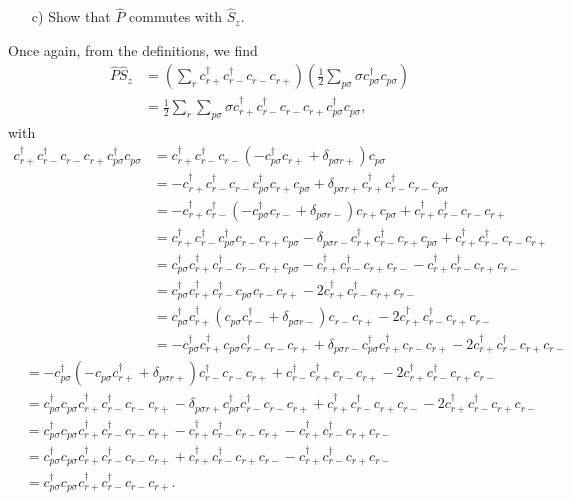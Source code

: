 \documentclass[a4paper]{article}
\newcommand{\nn}{\nonumber}
\newcommand{\ps}{{p\sigma}}
\newcommand{\crp}{c_{r+}}
\newcommand{\crpd}{c_{r+}^\dagger}
\newcommand{\crm}{c_{r-}}
\newcommand{\crmd}{c_{r-}^\dagger}
\begin{document}
\begin{exframe}
\begin{itemize}
  \item[c)] Show that $\hat P$ commutes with $\hat S_z$.
\end{itemize}
\end{exframe}
Once again, from the definitions, we find
\begin{align}
\hat P \hat S_z &= \left( \sum_r \crpd \crmd \crm \crp \right) \left( \frac{1}{2}\sum_\ps \sigma c_\ps^\dagger c_\ps  \right) \nn\\
%
&= \frac{1}{2}\sum_r \sum_\ps  \sigma \crpd \crmd \crm \crp  c_\ps^\dagger c_\ps,
\end{align}
with
\begin{align}
\crpd \crmd \crm \crp  c_\ps^\dagger c_\ps &= \crpd \crmd \crm (-c_\ps^\dagger \crp + \delta_{p\sigma r+}) c_\ps \nn\\
%
&= -\crpd \crmd \crm c_\ps^\dagger \crp c_\ps + \delta_{p\sigma r+} \crpd \crmd \crm c_\ps \nn\\
%
&= -\crpd \crmd (- c_\ps^\dagger \crm + \delta_{p\sigma r-})\crp c_\ps +  \crpd \crmd \crm \crp \nn\\
%
&= \crpd \crmd c_\ps^\dagger \crm \crp c_\ps -  \delta_{p\sigma r-}\crpd \crmd\crp c_\ps + \crpd \crmd \crm \crp \nn\\
%
&= c_\ps^\dagger\crpd \crmd  \crm \crp c_\ps -  \crpd \crmd\crp \crm - \crpd \crmd \crp\crm  \nn\\
%
&= c_\ps^\dagger\crpd \crmd c_\ps  \crm \crp  -  2\crpd \crmd \crp\crm  \nn\\
%
&= c_\ps^\dagger\crpd ( c_\ps \crmd + \delta_{p\sigma r-})  \crm \crp  -  2\crpd \crmd \crp\crm  \nn\\
%
&= -c_\ps^\dagger\crpd  c_\ps \crmd \crm \crp + \delta_{p\sigma r-}c_\ps^\dagger\crpd  \crm \crp -  2\crpd \crmd \crp\crm  \nn
\end{align}
\begin{align}
&= -c_\ps^\dagger (- c_\ps\crpd + \delta_{p\sigma r+}) \crmd \crm \crp + \crmd\crpd  \crm \crp -  2\crpd \crmd \crp\crm  \nn\\
%
&= c_\ps^\dagger c_\ps\crpd \crmd \crm \crp - \delta_{p\sigma r+} c_\ps^\dagger\crmd \crm \crp + \crpd\crmd   \crp\crm -  2\crpd \crmd \crp\crm  \nn\\
%
&= c_\ps^\dagger c_\ps\crpd \crmd \crm \crp -  \crpd\crmd \crm \crp - \crpd \crmd \crp\crm  \nn\\
%
&= c_\ps^\dagger c_\ps\crpd \crmd \crm \crp +  \crpd\crmd \crp\crm  - \crpd \crmd \crp\crm  \nn\\
%
&= c_\ps^\dagger c_\ps\crpd \crmd \crm \crp.
\end{align}
\end{document}
